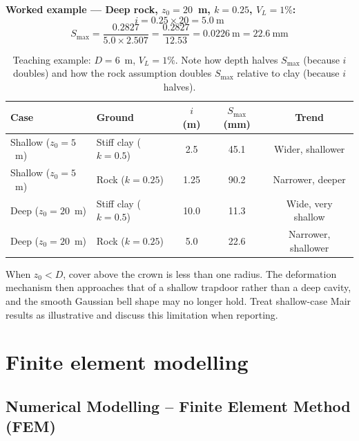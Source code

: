 \textbf{Worked example --- Deep rock, $z_0 = 20$~m, $k=0.25$, $V_L = 1\%$:}
\[
i = 0.25 \times 20 = 5.0\ \text{m}
\]
\[
S_{\text{max}} = \frac{0.2827}{5.0 \times 2.507} = \frac{0.2827}{12.53} = 0.0226\ \text{m} = 22.6\ \text{mm}
\]

\begin{table}[h!]
\centering
\small
\begin{tabular}{l l c c c}
\toprule
\textbf{Case} & \textbf{Ground} & $i$ (m) & $S_{\text{max}}$ (mm) & \textbf{Trend} \\
\midrule
Shallow ($z_0=5$~m) & Stiff clay ($k=0.5$) & 2.5 & 45.1 & Wider, shallower \\
Shallow ($z_0=5$~m) & Rock ($k=0.25$) & 1.25 & 90.2 & Narrower, deeper \\
Deep ($z_0=20$~m) & Stiff clay ($k=0.5$) & 10.0 & 11.3 & Wide, very shallow \\
Deep ($z_0=20$~m) & Rock ($k=0.25$) & 5.0 & 22.6 & Narrower, shallower \\
\bottomrule
\end{tabular}
\caption{Teaching example: $D = 6$~m, $V_L = 1\%$. Note how depth halves $S_{\text{max}}$ (because $i$ doubles) and how the rock assumption doubles $S_{\text{max}}$ relative to clay (because $i$ halves).}
\label{tab:teaching_example}
\end{table}

\begin{warnbox}
When $z_0 < D$, cover above the crown is less than one radius. The deformation mechanism then approaches that of a shallow trapdoor rather than a deep cavity, and the smooth Gaussian bell shape may no longer hold. Treat shallow-case Mair results as illustrative and discuss this limitation when reporting.
\end{warnbox}

\section{Finite element modelling}
\label{sec:finite-element-modelling}

\subsection{Numerical Modelling -- Finite Element Method (FEM)}

